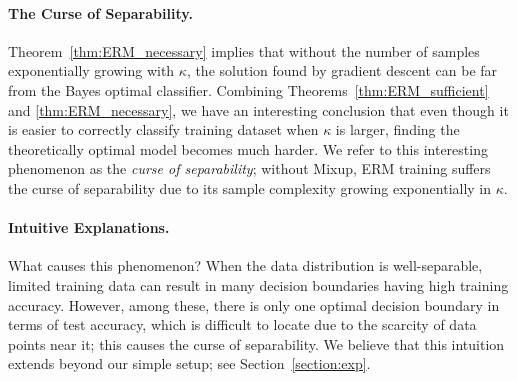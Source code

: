 \paragraph{The Curse of Separability.}Theorem~\ref{thm:ERM_necessary} implies that without the number of samples exponentially growing with $\kappa$, the solution found by gradient descent can be far from the Bayes optimal classifier. Combining Theorems~\ref{thm:ERM_sufficient} and \ref{thm:ERM_necessary}, we have an interesting conclusion that even though it is easier to correctly classify training dataset when $\kappa$ is larger, finding the theoretically optimal model becomes much harder. We refer to this interesting phenomenon as the \emph{curse of separability}; without Mixup, ERM training suffers the curse of separability due to its sample complexity growing exponentially in $\kappa$.
\vspace{-5pt}
\paragraph{Intuitive Explanations.}
What causes this phenomenon? 
When the data distribution is well-separable, limited training data can result in many decision boundaries having high training accuracy. However, among these, there is only one optimal decision boundary in terms of test accuracy, which is difficult to locate due to the scarcity of data points near it; this causes the curse of separability. We believe that this intuition extends beyond our simple setup; see Section~\ref{section:exp}.